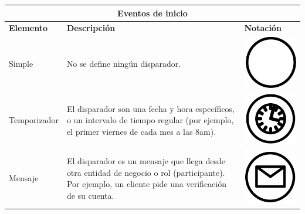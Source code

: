\begin{table}[H]
	\centering
	\begin{tabular}{ |p{2cm}|p{9.5cm}|p{1.7cm} |  }
		\hline
		\multicolumn{3}{|c|}{Eventos de inicio} \\
		\hline
		\textbf{Elemento}& \textbf{Descripción}&\textbf{Notación}\\
		
		\hline
		{\small Simple } & {\small No se define ningún disparador. } & \vspace{0.5mm} \hspace{2mm} \includegraphics[scale=0.2]{Capitulo2/imagenes/Evento2} \\
		
		\hline
		{\small Temporizador } & {\small El disparador son una fecha y hora específicos, o un intervalo de tiempo regular (por ejemplo, el primer viernes de cada mes a las 8am). } & \vspace{2mm} \hspace{2mm} \includegraphics[scale=0.2]{Capitulo2/imagenes/EventoT}\\
		
		\hline
		{\small Mensaje } & {\small El disparador es un mensaje que llega desde otra entidad de negocio o rol (participante). Por ejemplo, un cliente pide una verificación de su cuenta. } & \vspace{1mm} \hspace{2mm} \includegraphics[scale=0.2]{Capitulo2/imagenes/EventoM}\\
		

\end{tabular}
\end{table}
